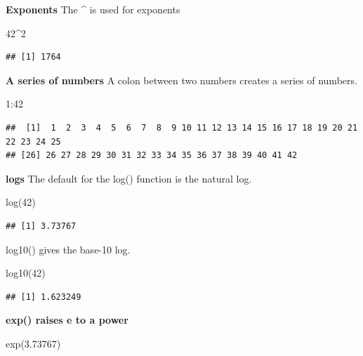 \documentclass[
]{book}
\newenvironment{Shaded}{\begin{snugshade}}{\end{snugshade}}
\newcommand{\DecValTok}[1]{\textcolor[rgb]{0.00,0.00,0.81}{#1}}
\newcommand{\FloatTok}[1]{\textcolor[rgb]{0.00,0.00,0.81}{#1}}
\newcommand{\FunctionTok}[1]{\textcolor[rgb]{0.00,0.00,0.00}{#1}}
\newcommand{\NormalTok}[1]{#1}
\newcommand{\SpecialCharTok}[1]{\textcolor[rgb]{0.00,0.00,0.00}{#1}}
\begin{document}
\textbf{Exponents}
The \textbf{\^{}} is used for exponents

\begin{Shaded}
\begin{Highlighting}[]
\DecValTok{42}\SpecialCharTok{\^{}}\DecValTok{2}
\end{Highlighting}
\end{Shaded}

\begin{verbatim}
## [1] 1764
\end{verbatim}

\textbf{A series of numbers}
A colon between two numbers creates a series of numbers.

\begin{Shaded}
\begin{Highlighting}[]
\DecValTok{1}\SpecialCharTok{:}\DecValTok{42}
\end{Highlighting}
\end{Shaded}

\begin{verbatim}
##  [1]  1  2  3  4  5  6  7  8  9 10 11 12 13 14 15 16 17 18 19 20 21 22 23 24 25
## [26] 26 27 28 29 30 31 32 33 34 35 36 37 38 39 40 41 42
\end{verbatim}

\textbf{logs}
The default for the log() function is the natural log.

\begin{Shaded}
\begin{Highlighting}[]
\FunctionTok{log}\NormalTok{(}\DecValTok{42}\NormalTok{)}
\end{Highlighting}
\end{Shaded}

\begin{verbatim}
## [1] 3.73767
\end{verbatim}

log10() gives the base-10 log.

\begin{Shaded}
\begin{Highlighting}[]
\FunctionTok{log10}\NormalTok{(}\DecValTok{42}\NormalTok{)}
\end{Highlighting}
\end{Shaded}

\begin{verbatim}
## [1] 1.623249
\end{verbatim}

\textbf{exp() raises e to a power}

\begin{Shaded}
\begin{Highlighting}[]
\FunctionTok{exp}\NormalTok{(}\FloatTok{3.73767}\NormalTok{)}
\end{Highlighting}
\end{Shaded}
\end{document}
